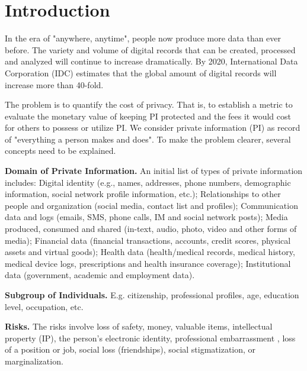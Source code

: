 \documentclass[a4paper,12pt]{texMemo} %
\begin{document}
\maketitle %


\section{Introduction}
In the era of "anywhere, anytime",  people now produce more data than ever before. The variety and volume of digital records that can be created, processed and analyzed will continue to increase dramatically. By 2020, International Data Corporation (IDC) estimates that the global amount of digital records will increase more than 40-fold. 

The problem is to quantify the cost of privacy. That is, to establish a metric to evaluate the monetary value of keeping PI protected and the fees it would cost for others to possess or utilize PI. We consider private information (PI) as record of "everything a person makes and does". To make the problem clearer, several concepts need to be explained.

\textbf{Domain of Private Information.}   An initial list of types of private information includes:
Digital identity (e.g., names, addresses, phone numbers, demographic information, social network profile information, etc.); Relationships to other people and organization (social media, contact list and profiles); Communication data and logs (emails, SMS, phone calls, IM and social network posts); Media produced, consumed and shared (in-text, audio, photo, video and other forms of media); Financial data (financial transactions, accounts, credit scores, physical assets and virtual goods); Health data (health/medical records, medical history, medical device logs, prescriptions and health insurance coverage); Institutional data (government, academic and employment data).

\textbf{Subgroup of Individuals.} E.g. citizenship, professional profiles, age, education level, occupation, etc.

\textbf{Risks.} The risks involve loss of safety, money, valuable items, intellectual property (IP),  the person's electronic identity, professional embarrassment , loss of a position or job, social loss (friendships), social stigmatization, or marginalization.
\end{document}
